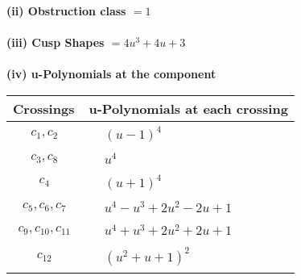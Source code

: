 \documentclass[1p]{elsarticle_modified}
\theoremstyle{definition}
\begin{document}
\flushleft \textbf{(ii) Obstruction class $= 1$}\\~\\
\flushleft \textbf{(iii) Cusp Shapes $= 4 u^3+4 u+3$}\\~\\
\newpage\renewcommand{\arraystretch}{1}
\flushleft \textbf{(iv) u-Polynomials at the component}\newline \\
\begin{tabular}{m{50pt}|m{274pt}}
Crossings & \hspace{64pt}u-Polynomials at each crossing \\
\hline $$\begin{aligned}c_{1},c_{2}\end{aligned}$$&$\begin{aligned}
&(u-1)^4
\end{aligned}$\\
\hline $$\begin{aligned}c_{3},c_{8}\end{aligned}$$&$\begin{aligned}
&u^4
\end{aligned}$\\
\hline $$\begin{aligned}c_{4}\end{aligned}$$&$\begin{aligned}
&(u+1)^4
\end{aligned}$\\
\hline $$\begin{aligned}c_{5},c_{6},c_{7}\end{aligned}$$&$\begin{aligned}
&u^4- u^3+2 u^2-2 u+1
\end{aligned}$\\
\hline $$\begin{aligned}c_{9},c_{10},c_{11}\end{aligned}$$&$\begin{aligned}
&u^4+u^3+2 u^2+2 u+1
\end{aligned}$\\
\hline $$\begin{aligned}c_{12}\end{aligned}$$&$\begin{aligned}
&(u^2+u+1)^2
\end{aligned}$\\
\hline
\end{tabular}\\~\\
\end{document}
